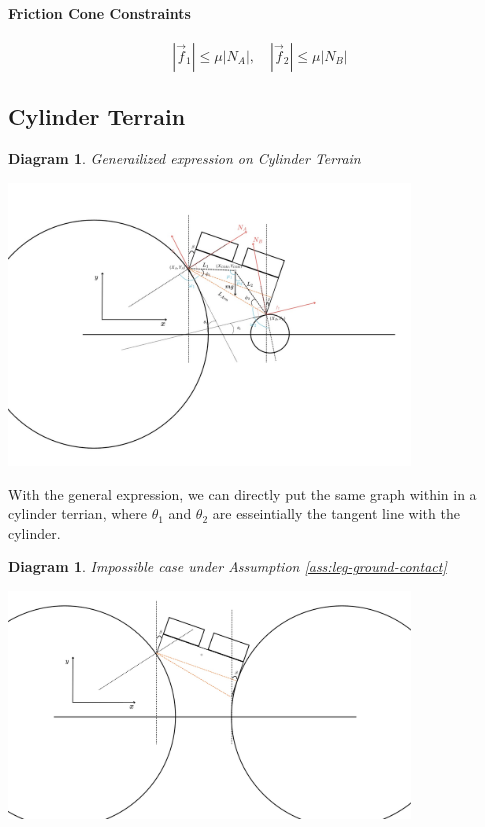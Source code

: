 \documentclass[11pt]{article}
\newtheorem{diagram}[statement]{Diagram}
\begin{document}
\paragraph{Friction Cone Constraints}
\[
|\vec{f}_1| \leq \mu |N_A|, \quad 
|\vec{f}_2| \leq \mu |N_B|
\]

\subsection*{Cylinder Terrain}

\begin{diagram}
    Generailized expression on Cylinder Terrain
\end{diagram}
\vspace{1ex} %
\begin{center}
    \includegraphics[width=0.8\textwidth]{figs/Generailized expression on Cylinder Terrain.jpg} %
\end{center}

With the general expression, we can directly put the same graph within in a cylinder terrian, where
\(\theta_1\) and \(\theta_2\) are esseintially the tangent line with the cylinder. 

\begin{diagram}
    Impossible case under Assumption \ref{ass:leg-ground-contact}
\end{diagram}
\vspace{1ex} %
\begin{center}
    \includegraphics[width=0.8\textwidth]{figs/Impossible case under Assumption.jpg} %
\end{center}
\end{document}
